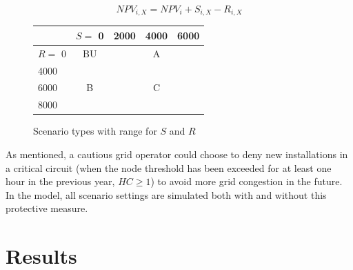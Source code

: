 \documentclass[12PT, ]{article}
\begin{document}
\begin{figure}[bth]
\centering
\begin{minipage}{0.45\textwidth}
\begin{equation}
\label{equ:NPV_calc_subs_adjust}
NPV_{i,X} = NPV_{i} + S_{i,X} - R_{i,X}
\end{equation}
\end{minipage}%
\hfill %
\begin{minipage}{0.50\textwidth}
\centering
\small
\begin{tabular}{|l| c c c c|}
    \hline
    & $S=$ 0 & 2000 & 4000 & 6000 \\
    \hline
    $R=$ 0    & BU      & \cellcolor{scenA_table} & \cellcolor{scenA_table} A & \cellcolor{scenA_table}  \\
     4000 & \cellcolor{scenB_table}    & \cellcolor{scenC_table} & \cellcolor{scenC_table}   & \cellcolor{scenC_table} \\
     6000 & \cellcolor{scenB_table} B  & \cellcolor{scenC_table} & \cellcolor{scenC_table} C & \cellcolor{scenC_table} \\
     8000 & \cellcolor{scenB_table}    & \cellcolor{scenC_table} & \cellcolor{scenC_table}   & \cellcolor{scenC_table} \\
    \hline
\end{tabular}
\caption{{\footnotesize Scenario types with range for $S$ and $R$}}
\label{tab:subs_range_SandR}
\end{minipage}
\end{figure}
\vspace{-0.5cm}

As mentioned, a cautious grid operator could choose to deny new installations in a critical circuit (when the node threshold has been exceeded for at least one hour in the previous year, $HC\geq1$) to avoid more grid congestion in the future.
In the model, all scenario settings are simulated both with and without this protective measure. 


\section{Results} \label{sec:results}%
\end{document}
